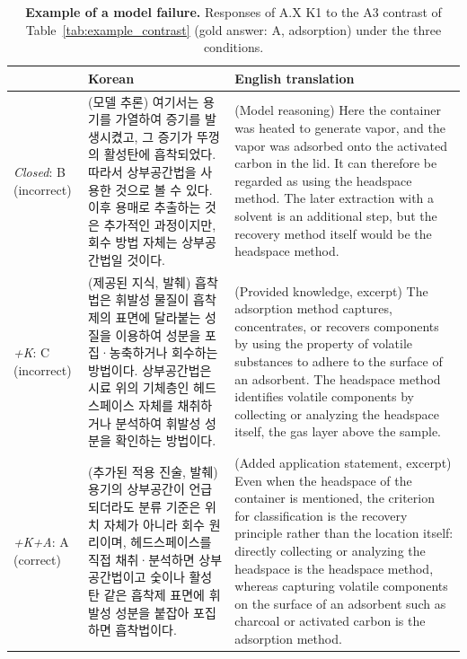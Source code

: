 \begin{table}[t]
\centering
\small
\caption{\textbf{Example of a model failure.}
Responses of A.X K1 to the A3 contrast of Table~\ref{tab:example_contrast} (gold answer: A, adsorption) under the three conditions.}
\label{tab:example_failure}
\begin{tabular}{@{}p{}p{}p{}@{}}
\toprule
 & \textbf{Korean} & \textbf{English translation} \\
\midrule
\textit{Closed}: B \newline (incorrect)
& (모델 추론) 여기서는 용기를 가열하여 증기를 발생시켰고, 그 증기가 뚜껑의 활성탄에 흡착되었다. 따라서 상부공간법을 사용한 것으로 볼 수 있다. 이후 용매로 추출하는 것은 추가적인 과정이지만, 회수 방법 자체는 상부공간법일 것이다.
& (Model reasoning) Here the container was heated to generate vapor, and the vapor was adsorbed onto the activated carbon in the lid. It can therefore be regarded as using the headspace method. The later extraction with a solvent is an additional step, but the recovery method itself would be the headspace method. \\
\midrule
\textit{+K}: C \newline (incorrect)
& (제공된 지식, 발췌) 흡착법은 휘발성 물질이 흡착제의 표면에 달라붙는 성질을 이용하여 성분을 포집·농축하거나 회수하는 방법이다. 상부공간법은 시료 위의 기체층인 헤드스페이스 자체를 채취하거나 분석하여 휘발성 성분을 확인하는 방법이다.
& (Provided knowledge, excerpt) The adsorption method captures, concentrates, or recovers components by using the property of volatile substances to adhere to the surface of an adsorbent. The headspace method identifies volatile components by collecting or analyzing the headspace itself, the gas layer above the sample. \\
\midrule
\textit{+K+A}: A \newline (correct)
& (추가된 적용 진술, 발췌) 용기의 상부공간이 언급되더라도 분류 기준은 위치 자체가 아니라 회수 원리이며, 헤드스페이스를 직접 채취·분석하면 상부공간법이고 숯이나 활성탄 같은 흡착제 표면에 휘발성 성분을 붙잡아 포집하면 흡착법이다.
& (Added application statement, excerpt) Even when the headspace of the container is mentioned, the criterion for classification is the recovery principle rather than the location itself: directly collecting or analyzing the headspace is the headspace method, whereas capturing volatile components on the surface of an adsorbent such as charcoal or activated carbon is the adsorption method. \\
\bottomrule
\end{tabular}
\end{table}